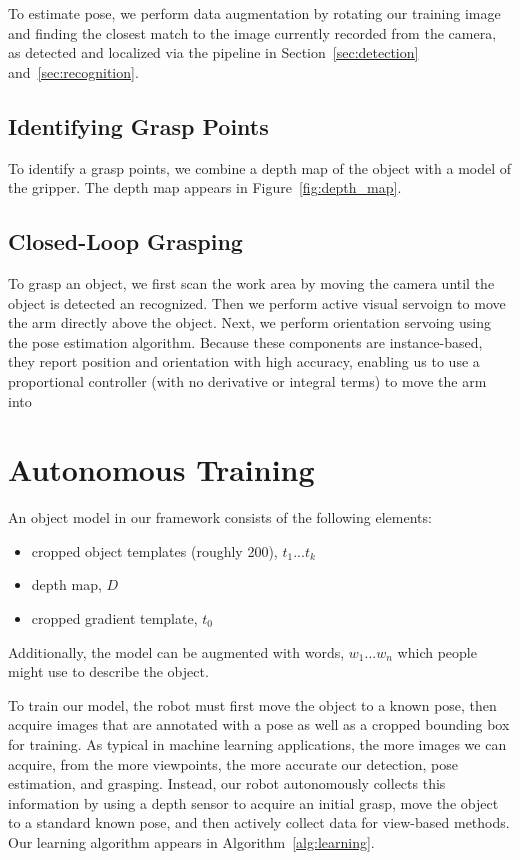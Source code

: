\documentclass[conference]{IEEEtran}
\begin{document}
To estimate pose, we perform data augmentation by rotating our
training image and finding the closest match to the image currently
recorded from the camera, as detected and localized via the pipeline
in Section~\ref{sec:detection} and~\ref{sec:recognition}.

\subsection{Identifying Grasp Points}

To identify a grasp points, we combine a depth map of the object with
a model of the gripper.  The depth map appears in
Figure~\ref{fig:depth_map}.

\subsection{Closed-Loop Grasping}

To grasp an object, we first scan the work area by moving the camera
until the object is detected an recognized.  Then we perform active
visual servoign to move the arm directly above the object.  Next, we
perform orientation servoing using the pose estimation
algorithm. Because these components are instance-based, they report
position and orientation with high accuracy, enabling us to use a
proportional controller (with no derivative or integral terms) to move
the arm into





\section{Autonomous Training}
\label{sec:training}

An object model in our framework consists of the following elements:
\begin{itemize}
\item cropped object templates (roughly 200), $t_1 ... t_k$
\item depth map, $D$
\item cropped gradient template, $t_0$
\end{itemize}

Additionally, the model can be augmented with words, $w_1... w_n$
which people might use to describe the object.

To train our model, the robot must first move the object to a known
pose, then acquire images that are annotated with a pose as well as a
cropped bounding box for training.  As typical in machine learning
applications, the more images we can acquire, from the more
viewpoints, the more accurate our detection, pose estimation, and
grasping.   Instead, our robot
autonomously collects this information by using a depth sensor to
acquire an initial grasp, move the object to a standard known pose,
and then actively collect data for view-based methods.  Our learning
algorithm appears in Algorithm~\ref{alg:learning}.
\end{document}
